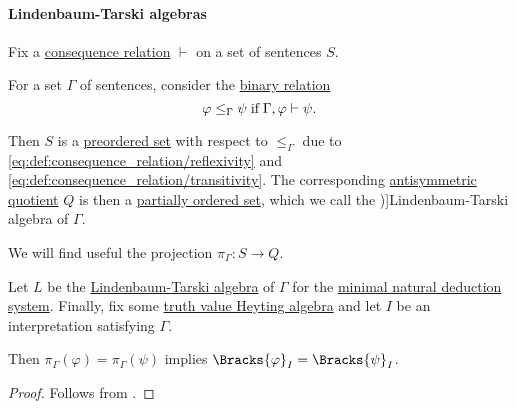\paragraph{Lindenbaum-Tarski algebras}

\begin{definition}\label{def:lindenbaum_tarski_algebra}
  Fix a \hyperref[def:consequence_relation]{consequence relation} \( {\vdash} \) on a set of sentences \( S \).

  For a set \( \Gamma \) of sentences, consider the \hyperref[def:binary_relation]{binary relation}
  \begin{equation*}
    \varphi \leq_\Gamma \psi \T{if} \Gamma, \varphi \vdash \psi.
  \end{equation*}

  Then \( S \) is a \hyperref[def:preordered_set]{preordered set} with respect to \( \leq_\Gamma \) due to \eqref{eq:def:consequence_relation/reflexivity} and \eqref{eq:def:consequence_relation/transitivity}. The corresponding \hyperref[def:antisymmetric_quotient]{antisymmetric quotient} \( Q \) is then a \hyperref[def:partially_ordered_set]{partially ordered set}, which we call the \term[ru=алгебра Линденбаума-Тарского, en=Lindenbaum-Tarski algebra (\cite[def. 6.3.1]{CitkinMuravitsky2021})]{Lindenbaum-Tarski algebra} of \( \Gamma \).
\end{definition}
\begin{comments}
  \item We will find useful the projection \( \pi_\Gamma: S \to Q \).
\end{comments}

\begin{proposition}\label{thm:lindenbaum_tarski_algebra_soundness}
  Let \( L \) be the \hyperref[def:lindenbaum_tarski_algebra]{Lindenbaum-Tarski algebra} of \( \Gamma \) for the \hyperref[def:propositional_natural_deduction_systems]{minimal natural deduction system}. Finally, fix some \hyperref[def:truth_value_algebra]{truth value Heyting algebra} and let \( I \) be an interpretation satisfying \( \Gamma \).

  Then \( \pi_\Gamma(\varphi) = \pi_\Gamma(\psi) \) implies \( \Bracks{\varphi}_I = \Bracks{\psi}_I \).
\end{proposition}
\begin{proof}
  Follows from .
\end{proof}

